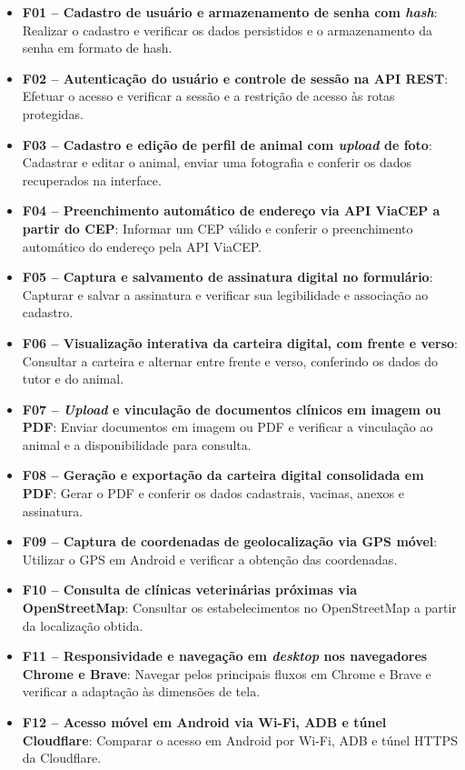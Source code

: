 \documentclass{UNESC}
\begin{document}
\begin{itemize}
    \item \textbf{F01 -- Cadastro de usuário e armazenamento de senha com \textit{hash}}: Realizar o cadastro e verificar os dados persistidos e o armazenamento da senha em formato de hash.
    \item \textbf{F02 -- Autenticação do usuário e controle de sessão na API REST}: Efetuar o acesso e verificar a sessão e a restrição de acesso às rotas protegidas.
    \item \textbf{F03 -- Cadastro e edição de perfil de animal com \textit{upload} de foto}: Cadastrar e editar o animal, enviar uma fotografia e conferir os dados recuperados na interface.
    \item \textbf{F04 -- Preenchimento automático de endereço via API ViaCEP a partir do CEP}: Informar um CEP válido e conferir o preenchimento automático do endereço pela API ViaCEP.
    \item \textbf{F05 -- Captura e salvamento de assinatura digital no formulário}: Capturar e salvar a assinatura e verificar sua legibilidade e associação ao cadastro.
    \item \textbf{F06 -- Visualização interativa da carteira digital, com frente e verso}: Consultar a carteira e alternar entre frente e verso, conferindo os dados do tutor e do animal.
    \item \textbf{F07 -- \textit{Upload} e vinculação de documentos clínicos em imagem ou PDF}: Enviar documentos em imagem ou PDF e verificar a vinculação ao animal e a disponibilidade para consulta.
    \item \textbf{F08 -- Geração e exportação da carteira digital consolidada em PDF}: Gerar o PDF e conferir os dados cadastrais, vacinas, anexos e assinatura.
    \item \textbf{F09 -- Captura de coordenadas de geolocalização via GPS móvel}: Utilizar o GPS em Android e verificar a obtenção das coordenadas.
    \item \textbf{F10 -- Consulta de clínicas veterinárias próximas via OpenStreetMap}: Consultar os estabelecimentos no OpenStreetMap a partir da localização obtida.
    \item \textbf{F11 -- Responsividade e navegação em \textit{desktop} nos navegadores Chrome e Brave}: Navegar pelos principais fluxos em Chrome e Brave e verificar a adaptação às dimensões de tela.
    \item \textbf{F12 -- Acesso móvel em Android via Wi-Fi, ADB e túnel Cloudflare}: Comparar o acesso em Android por Wi-Fi, ADB e túnel HTTPS da Cloudflare.

\end{itemize}
\end{document}
